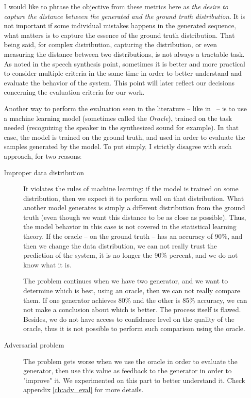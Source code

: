   \par I would like to phrase the objective from these metrics here as \textit{the desire to capture the distance between the generated and the ground truth distribution}. It is not important if some individual mistakes happens in the generated sequence, what matters is to capture the essence of the ground truth distribution. That being said, for complex distribution, capturing the distribution, or even measuring the distance between two distributions, is not always a tractable task. As noted in the speech synthesis point, sometimes it is better and more practical to consider multiple criteria in the same time in order to better understand and evaluate the behavior of the system. This point will later reflect our decisions concerning the evaluation  criteria for our work.

  \par Another way to perform the evaluation seen in the literature -- like in~\citep{wang2018style} -- is to use a machine learning model (sometimes called the \textit{Oracle}), trained on the task needed (recognizing the speaker in the synthesized sound for example). In that case, the model is trained on the ground truth, and used in order to evaluate the samples generated by the model. To put simply, I strictly disagree with such approach, for two reasons:
  \begin{description}
    \item [Improper data distribution] It violates the rules of machine learning: if the model is trained on some distribution, then we expect it to perform well on that distribution. What another model generates is simply a different distribution from the ground truth (even though we want this distance to be as close as possible). Thus, the model behavior in this case is not covered in the statistical learning theory. If the oracle -- on the ground truth -- has an accuracy of 90\%, and then we change the data distribution, we can not really trust the prediction of the system, it is no longer the 90\% percent, and we do not know what it is.

    The problem continues when we have two generator, and we want to determine which is best, using an oracle, then we can not really compare them. If one generator achieves 80\% and the other is 85\% accuracy, we can not make a conclusion about which is better. The process itself is flawed. Besides, we do not have access to confidence level on the quality of the oracle, thus it is not possible to perform such comparison using the oracle.

    \item [Adversarial problem] The problem gets worse when we use the oracle in order to evaluate the generator, then use this value as feedback to the generator in order to "improve" it. We experimented on this part to better understand it. Check appendix \ref{ch:adv_eval} for more details.
  \end{description}
